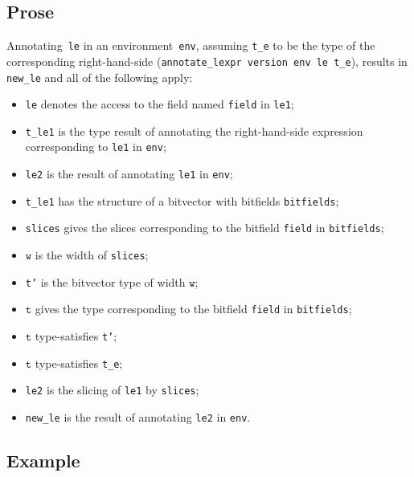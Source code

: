 \documentclass{book}
\newcommand\vt[0]{\texttt{t}}
\newcommand\vw[0]{\texttt{w}}
\begin{document}
\begin{itemize}
    \subsection{Prose}
   Annotating~\texttt{le} in an environment~\texttt{env}, assuming
\texttt{t\_e} to be the type of the corresponding right-hand-side
(\texttt{annotate\_lexpr version env le t\_e}), results in \texttt{new\_le} and
all of the following apply:
   \begin{itemize}
   \item \texttt{le} denotes the access to the field named \texttt{field} in \texttt{le1};
   \item \texttt{t\_le1} is the type result of annotating the right-hand-side expression corresponding to \texttt{le1} in \texttt{env};
   \item \texttt{le2} is the result of annotating \texttt{le1} in \texttt{env};
   \item \texttt{t\_le1} has the structure of a bitvector with bitfields \texttt{bitfields};
   \item \texttt{slices} gives the slices corresponding to the bitfield \texttt{field} in
      \texttt{bitfields};
   \item $\vw$ is the width of \texttt{slices};
   \item \texttt{t'} is the bitvector type of width $\vw$;
   \item $\vt$ gives the type corresponding to the bitfield \texttt{field} in
      \texttt{bitfields};
   \item $\vt$ type-satisfies \texttt{t'};
   \item $\vt$ type-satisfies \texttt{t\_e};
   \item \texttt{le2} is the slicing of \texttt{le1} by \texttt{slices};
   \item \texttt{new\_le} is the result of annotating \texttt{le2} in \texttt{env}.
   \end{itemize}

  \subsection{Example}



\begin{emptyformal}

\end{emptyformal}
\end{itemize}
\end{document}
